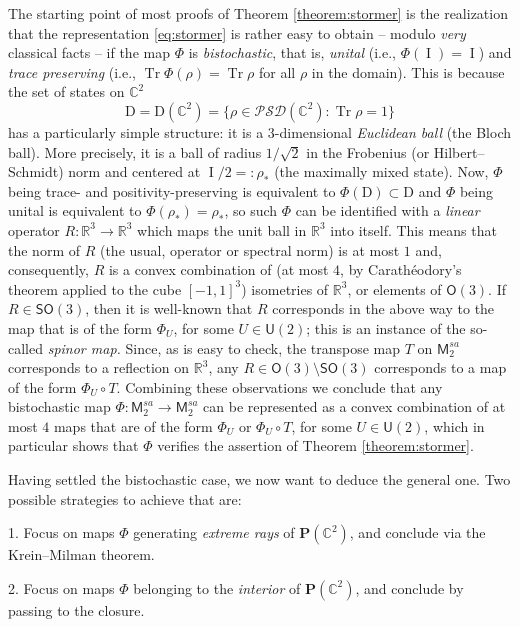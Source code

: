 \documentclass[10pt]{article}
\DeclareMathOperator{\tr}{Tr}
\DeclareMathOperator{\Id}{I}
\newcommand{\cD}{\mathrm{D}}
\newcommand{\PSD}{\mathcal{PSD}}
\newcommand{\cP}{\bm{P}}
\newcommand{\R}{\mathbb{R}}
\newcommand{\C}{\mathbb{C}}
\newcommand{\cM}{\mathsf{M}}
\newcommand{\gU}{\mathsf{U}}
\newcommand{\gO}{\mathsf{O}}
\newcommand{\gSO}{\mathsf{SO}}
\theoremstyle{plain}
\theoremstyle{definition}
\theoremstyle{remark}
\begin{document}
The starting point of most proofs of Theorem \ref{theorem:stormer} is the realization that 
the representation \eqref{eq:stormer} is rather easy to obtain 
-- modulo {\em very} classical facts --  if the map $\Phi$ is {\em bistochastic}, that is, {\em unital}  (i.e., $\Phi(\Id) = \Id$) 
and {\em trace  preserving} (i.e., $\tr \Phi(\rho) = \tr \rho$ for all $\rho$ in the domain). 
This is because the set of states on $\C^2$ 
\[
\cD =  \cD(\C^2) = \{\rho \in \PSD(\C^2) : \tr \rho =1 \}
 \]
has a particularly simple structure:  it is a $3$-dimensional {\em Euclidean ball} (the Bloch ball). 
 More precisely, it is a ball of radius %
 $1/\sqrt{2}$ in the Frobenius (or Hilbert--Schmidt) norm and centered at $\Id/2 =: \rho_*$ (the maximally mixed state). 
Now, $\Phi$ being trace- and positivity-preserving is equivalent to $\Phi(\cD) \subset \cD$ and 
$\Phi$ being unital is equivalent to $\Phi(\rho_*) = \rho_*$, so such $\Phi$ can be identified 
with a {\em linear} operator $R : \R^3 \to \R^3$ which maps the unit ball in $\R^3$ into itself. 
This means that the norm of $R$  (the usual, operator or spectral norm) is at most $1$ and, 
consequently, $R$ is a convex combination of (at most $4$, by Carath\'eodory's theorem 
applied to the cube $[-1,1]^3$)
 isometries of $\R^3$, or elements of $\gO(3)$. 
If $R \in \gSO(3)$, then it is well-known that $R$ corresponds in the above way to the map that is 
of the form $\Phi_U$, for some $U \in \gU(2)$; this is an instance of the so-called {\em spinor map. }  
Since, as is easy to check,  
the transpose map $T$ on $\cM_2^{sa}$ corresponds to a reflection on $\R^3$, any 
$R \in \gO(3) \setminus \gSO(3)$ corresponds to a map of the form $\Phi_U \circ T$. 
Combining these observations we conclude that any bistochastic map $\Phi : \cM_2^{sa} \to \cM_2^{sa}$  
can be represented as a convex combination of at most $4$ maps that are of the form $\Phi_U$
or  $\Phi_U \circ T$, for some $U \in \gU(2)$, which in particular shows that 
$\Phi$ verifies the assertion of Theorem  \ref{theorem:stormer}. 

\smallskip 
Having settled the bistochastic case, we now want to deduce the general one. 
Two possible strategies to achieve that are:  

1. Focus on maps $\Phi$  generating {\em extreme rays} of $\cP(\C^2)$, and conclude via the Krein--Milman theorem. 

2. Focus on maps $\Phi$  belonging to the {\em interior} of $\cP(\C^2)$, and conclude 
by passing to the closure. 
\end{document}
